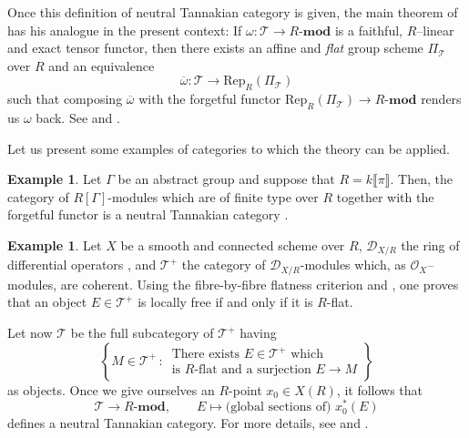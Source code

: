 \documentclass[10pt]{alggeom}
\theoremstyle{definition}
\newtheorem{ex}[thm]{Example}
\numberwithin{equation}{section}
\begin{document}
Once this definition of neutral Tannakian category is given, the main theorem of \cite[Theorem 2.11]{deligne-milne82} has his analogue in the present context: If $\omega:\mathcal T\to R\text{-}\mathbf{mod}$ is a faithful, $R$--linear and exact tensor functor, then there exists an affine and {\it flat} group scheme $\Pi_{\mathcal T}$ over $R$ and an equivalence 
\[
\overline\omega: \mathcal T\longrightarrow\mathrm{Rep}_R(\Pi_{\mathcal T})
\]
such that composing $\overline\omega$ with the forgetful functor $\mathrm{Rep}_R(\Pi_{\mathcal T})\to R\text{-}\mathbf{mod}$ renders us $\omega$ back. See \cite[II.4.1.1]{saavedra72} and \cite[Theorem 1.2.2]{duong-hai18}.



Let us present some examples of categories to which the theory can be applied. 


\begin{ex}Let $\Gamma$ be an abstract group and suppose that $R=k\llbracket \pi\rrbracket$. Then, the category of $R[\Gamma]$-modules which are of finite type over $R$ together with the forgetful functor is a neutral Tannakian category \cite[4.1]{hai-dos_santos21}. 
\end{ex}

\begin{ex}\label{05.06.2023--3jp}Let $X$ be a smooth and connected scheme over $R$,  $\mathcal{D}_{X/R}$ the ring of differential operators \cite[IV.16.8]{EGA},  and  $\mathcal T^+$  the category of $\mathcal{D}_{X/R}$-modules which, as $\mathcal O_X$--modules, are coherent. Using the fibre-by-fibre flatness criterion and \cite{berthelot-ogus78}, one proves that an object $E\in \mathcal T^+$ is locally free if and only if it is $R$-flat. 

 
 
Let now $\mathcal T$ be the full subcategory of $\mathcal T^+$    having
\[\left\{M\in\mathcal T^+\,:\,\begin{array}{c}\text{There exists $E\in\mathcal T^+$ which }
\\
\text{is $R$-flat and a surjection $E\to M$}
\end{array}\right\}\] 
as objects.   Once we give ourselves an $R$-point $x_0\in X(R)$, it follows that 
\[
\mathcal T\longrightarrow R\text{-}\mathbf{mod},\qquad E\longmapsto \text{(global sections of) $x_0^*(E)$}
\] 
defines a neutral Tannakian category. For more details, see \cite{And01} and \cite{duong-hai-dos_santos18}. 
\end{ex}
\end{document}
